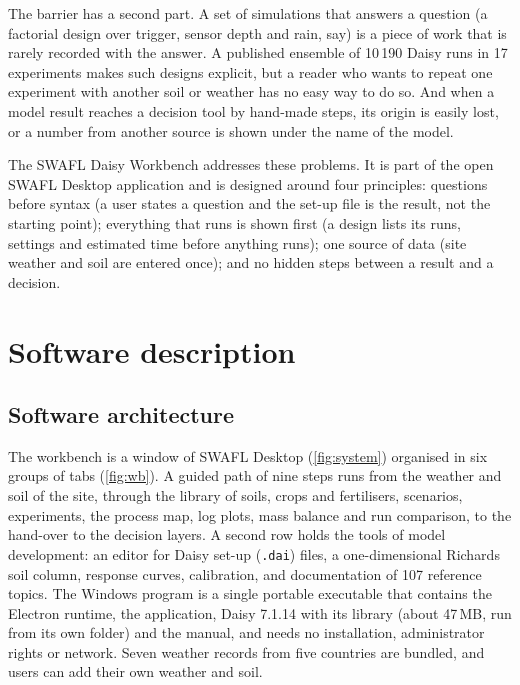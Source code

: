 \documentclass[preprint,12pt]{elsarticle}
\begin{document}
The barrier has a second part. A set of simulations that answers a question (a factorial design over trigger, sensor depth and rain, say) is a piece of work that is rarely recorded with the answer. A published ensemble of 10\,190 Daisy runs in 17 experiments \cite{HaliluData} makes such designs explicit, but a reader who wants to repeat one experiment with another soil or weather has no easy way to do so. And when a model result reaches a decision tool by hand-made steps, its origin is easily lost, or a number from another source is shown under the name of the model.

The SWAFL Daisy Workbench addresses these problems. It is part of the open SWAFL Desktop application and is designed around four principles: questions before syntax (a user states a question and the set-up file is the result, not the starting point); everything that runs is shown first (a design lists its runs, settings and estimated time before anything runs); one source of data (site weather and soil are entered once); and no hidden steps between a result and a decision.

\section{Software description}
\subsection{Software architecture}
The workbench is a window of SWAFL Desktop (\cref{fig:system}) organised in six groups of tabs (\cref{fig:wb}). A guided path of nine steps runs from the weather and soil of the site, through the library of soils, crops and fertilisers, scenarios, experiments, the process map, log plots, mass balance and run comparison, to the hand-over to the decision layers. A second row holds the tools of model development: an editor for Daisy set-up (\texttt{.dai}) files, a one-dimensional Richards soil column, response curves, calibration, and documentation of 107 reference topics. The Windows program is a single portable executable that contains the Electron runtime, the application, Daisy 7.1.14 with its library (about 47\,MB, run from its own folder) and the manual, and needs no installation, administrator rights or network. Seven weather records from five countries are bundled, and users can add their own weather and soil.
\end{document}
